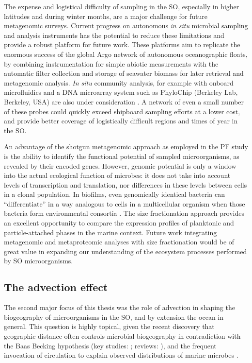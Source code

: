 The expense and logistical difficulty of sampling in the \ac{SO}, especially in higher latitudes and during winter months, are a major challenge for future metagenomic surveys.
Current progress on autonomous \textit{in situ} microbial sampling and analysis instruments \cite{CSIRO:2012uw} has the potential to reduce these limitations and provide a robust platform for future work.
These platforms aim to replicate the enormous success of the global Argo network of autonomous oceanographic floats, by combining instrumentation for simple abiotic measurements with the automatic filter collection and storage of seawater biomass for later retrieval and metagenomic analysis.
\textit{In situ} community analysis, for example with onboard microfluidics and a DNA microarray system such as PhyloChip (Berkeley Lab, Berkeley, USA) are also under consideration \cite{CSIRO:2012uw}.
A network of even a small number of these probes could quickly exceed shipboard sampling efforts at a lower cost, and provide better coverage of logistically difficult regions and times of year in the \ac{SO}.

An advantage of the shotgun metagenomic approach as employed in the \ac{PF} study is the ability to identify the functional potential of sampled microorganisms, as revealed by their encoded genes.
However, genomic potential is only a window into the actual ecological function of microbes: it does not take into account levels of transcription and translation, nor differences in these levels between cells in a clonal population.
In biofilms, even genomically identical bacteria can ``differentiate'' in a way analogous to cells in a multicellular organism when those bacteria form environmental consortia \cite{Sauer:2002ux}.
The size fractionation approach provides an excellent opportunity to compare the expression profiles of planktonic and particle-attached \citep[i.e.\ potentially biofilm-forming; see][]{Grossart:2003uv} phases in the marine context.
Future work integrating metagenomic and metaproteomic analyses with size fractionation would be of great value in expanding our understanding of the ecosystem processes performed by \ac{SO} microorganisms.

\subsection{The advection effect}

The second major focus of this thesis was the role of advection in shaping the biogeography of microorganisms in the \ac{SO}, and by extension the ocean in general.
This question is highly topical, given the recent discovery that geographic distance often controls microbial biogeography in contradiction with the Baas Becking hypothesis (key studies: \citet{Cho:2000tn,Whitaker:2003dz}; reviews: \citet{Martiny:2006jy,Hanson:2012cb}), and the frequent invocation of circulation to explain observed distributions of marine microbes \citep[e.g.][]{Lauro:2007bf,Giebel:2009hr,Ghiglione:2012ei,Sul:2013in}.

